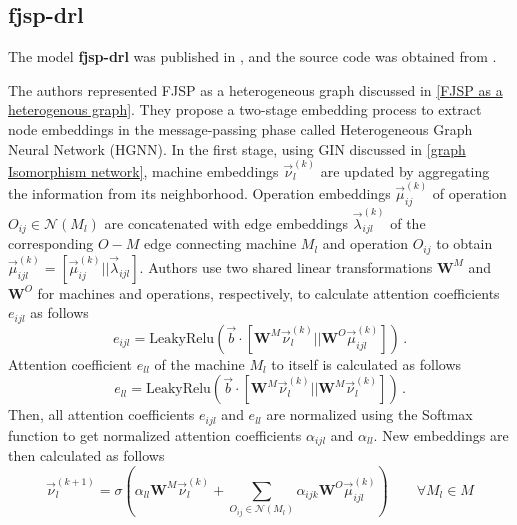 \subsection{fjsp-drl} \label{model_fjsp_drl}

The model \textbf{fjsp-drl} was published in \cite{9826438}, and the source code was obtained from \cite{github_fjsp_drl}.
\par
The authors represented FJSP as a heterogeneous graph discussed in \ref{FJSP as a heterogenous graph}. They propose a two-stage embedding process to extract node embeddings in the message-passing phase called Heterogeneous Graph Neural Network (HGNN). In the first stage, using GIN discussed in \ref{graph Isomorphism network}, machine embeddings $\vec{\nu}_l^{(k)}$ are updated by aggregating the information from its neighborhood. Operation embeddings $\vec{\mu}_{ij}^{(k)}$ of operation $O_{ij} \in \mathcal{N}(M_l)$ are concatenated with edge embeddings $\vec{\lambda}_{ijl}^{(k)}$ of the corresponding $O-M$ edge connecting machine $M_l$ and operation $O_{ij}$ to obtain $\vec{\mu}_{ijl}^{(k)} = \left [ \vec{\mu}_{ij}^{(k)}||\vec{\lambda}_{ijl}\right ]$. Authors use two shared linear transformations $\boldsymbol{W}^M$ and $\boldsymbol{W}^O$ for machines and operations, respectively, to calculate attention coefficients $e_{ijl}$ as follows \cite{9826438}
\begin{equation}
    e_{ijl} = \text{LeakyRelu}\left (\vec{b} \cdot \left [ \boldsymbol{W}^M \vec{\nu}_l^{(k)} || \boldsymbol{W}^O \vec{\mu}_{ijl}^{(k)} \right ]\right ) \, .
\end{equation}
Attention coefficient $e_{ll}$ of the machine $M_l$ to itself is calculated as follows \cite{9826438}
\begin{equation}
    e_{ll} = \text{LeakyRelu}\left (\vec{b} \cdot \left [ \boldsymbol{W}^M \vec{\nu}_l^{(k)} || \boldsymbol{W}^M \vec{\nu}_l^{(k)} \right ]\right ) \, .
\end{equation}
Then, all attention coefficients $e_{ijl}$ and $e_{ll}$ are normalized using the Softmax function to get normalized attention coefficients $\alpha_{ijl}$ and $\alpha_{ll}$. New embeddings are then calculated as follows \cite{9826438}
\begin{equation}
    \vec{\nu}_l^{(k+1)} = \sigma \left ( \alpha_{ll} \boldsymbol{W}^M \vec{\nu}_l^{(k)} + \sum_{O_{ij} \in \mathcal{N}(M_l)} \alpha_{ijk} \boldsymbol{W}^O\vec{\mu}_{ijl}^{(k)}\right ) \hspace{2em} \forall M_l \in M
\end{equation}
